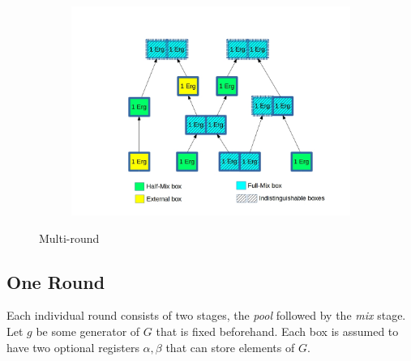 \documentclass[runningheads]{llncs}
\begin{document}
\begin{figure}[h]
	\centering
	\begin{subfigure}{.7\textwidth}
		\centering
		\includegraphics[width=\linewidth]{ZeroJoin}
	\end{subfigure}
	\caption{Multi-round \algname}
\label{fig:mixname}
\end{figure}

\subsection{One \algname Round}
Each individual \algname round consists of two stages, the {\em pool} followed by the {\em mix} stage. 
Let $g$ be some generator of $G$ that is fixed beforehand. Each box is assumed to have two optional registers $\alpha, \beta$ that can store elements of $G$.
\end{document}
